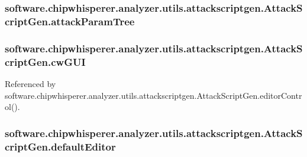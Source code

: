 \subsubsection[{attack\+Param\+Tree}]{\setlength{\rightskip}{0pt plus 5cm}software.\+chipwhisperer.\+analyzer.\+utils.\+attackscriptgen.\+Attack\+Script\+Gen.\+attack\+Param\+Tree}\label{classsoftware_1_1chipwhisperer_1_1analyzer_1_1utils_1_1attackscriptgen_1_1AttackScriptGen_a04ff4c80a9cd093de03afe897cfb1937}
\hypertarget{classsoftware_1_1chipwhisperer_1_1analyzer_1_1utils_1_1attackscriptgen_1_1AttackScriptGen_a57daf9081012e7eb81420d6d9c2b80a5}{}
\subsubsection[{cw\+G\+U\+I}]{\setlength{\rightskip}{0pt plus 5cm}software.\+chipwhisperer.\+analyzer.\+utils.\+attackscriptgen.\+Attack\+Script\+Gen.\+cw\+G\+U\+I}\label{classsoftware_1_1chipwhisperer_1_1analyzer_1_1utils_1_1attackscriptgen_1_1AttackScriptGen_a57daf9081012e7eb81420d6d9c2b80a5}


Referenced by software.\+chipwhisperer.\+analyzer.\+utils.\+attackscriptgen.\+Attack\+Script\+Gen.\+editor\+Control().

\hypertarget{classsoftware_1_1chipwhisperer_1_1analyzer_1_1utils_1_1attackscriptgen_1_1AttackScriptGen_ab587e57c96fd143d41aa52290de12a9e}{}
\subsubsection[{default\+Editor}]{\setlength{\rightskip}{0pt plus 5cm}software.\+chipwhisperer.\+analyzer.\+utils.\+attackscriptgen.\+Attack\+Script\+Gen.\+default\+Editor}\label{classsoftware_1_1chipwhisperer_1_1analyzer_1_1utils_1_1attackscriptgen_1_1AttackScriptGen_ab587e57c96fd143d41aa52290de12a9e}


